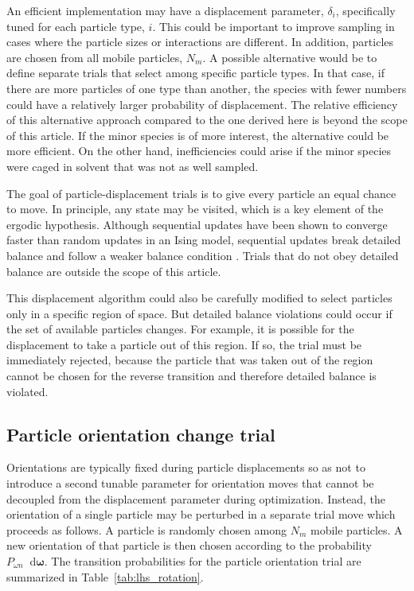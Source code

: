 \documentclass[
  9pt,
  bestpractices,
]{livecoms}
\newcommand*\diff{\mathop{}\!\mathrm{d}}
\begin{document}
An efficient implementation may have a displacement parameter, $\delta_i$, specifically tuned for each particle type, $i$.
This could be important to improve sampling in cases where the particle sizes or interactions are different.
In addition, particles are chosen from all mobile particles, $N_m$.
A possible alternative would be to define separate trials that select among specific particle types.
In that case, if there are more particles of one type than another, the species with fewer numbers could have a relatively larger probability of displacement.
The relative efficiency of this alternative approach compared to the one derived here is beyond the scope of this article.
If the minor species is of more interest, the alternative could be more efficient.
On the other hand, inefficiencies could arise if the minor species were caged in solvent that was not as well sampled.

The goal of particle-displacement trials is to give every particle an equal chance to move.
In principle, any state may be visited, which is a key element of the ergodic hypothesis.
Although sequential updates have been shown to converge faster than random updates in an Ising model, sequential updates break detailed balance and follow a weaker balance condition \cite{ren_acceleration_2006}.
Trials that do not obey detailed balance are outside the scope of this article.

This displacement algorithm could also be carefully modified to select particles only in a specific region of space.
But detailed balance violations could occur if the set of available particles changes.
For example, it is possible for the displacement to take a particle out of this region.
If so, the trial must be immediately rejected, because the particle that was taken out of the region cannot be chosen for the reverse transition and therefore detailed balance is violated.

\subsection{\label{sec:lhs_rotation}Particle orientation change trial}

Orientations are typically fixed during particle displacements so as not to introduce a second tunable parameter for orientation moves that cannot be decoupled from the displacement parameter during optimization.
Instead, the orientation of a single particle may be perturbed in a separate trial move which proceeds as follows.
A particle is randomly chosen among $N_m$ mobile particles.
A new orientation of that particle is then chosen according to the probability $P_{\omega n}\diff\boldsymbol{\omega}$.
The transition probabilities for the particle orientation trial are summarized in Table~\ref{tab:lhs_rotation}.
\end{document}
